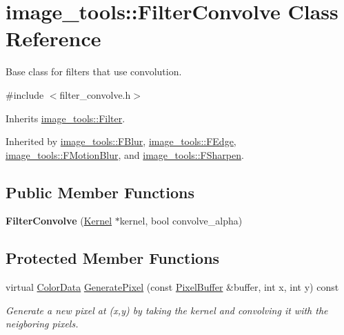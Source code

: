 \hypertarget{classimage__tools_1_1FilterConvolve}{}\section{image\+\_\+tools\+:\+:Filter\+Convolve Class Reference}
\label{classimage__tools_1_1FilterConvolve}


Base class for filters that use convolution.  




{\ttfamily \#include $<$filter\+\_\+convolve.\+h$>$}



Inherits \hyperlink{classimage__tools_1_1Filter}{image\+\_\+tools\+::\+Filter}.



Inherited by \hyperlink{classimage__tools_1_1FBlur}{image\+\_\+tools\+::\+F\+Blur}, \hyperlink{classimage__tools_1_1FEdge}{image\+\_\+tools\+::\+F\+Edge}, \hyperlink{classimage__tools_1_1FMotionBlur}{image\+\_\+tools\+::\+F\+Motion\+Blur}, and \hyperlink{classimage__tools_1_1FSharpen}{image\+\_\+tools\+::\+F\+Sharpen}.

\subsection*{Public Member Functions}
\begin{DoxyCompactItemize}
\item 
{\bfseries Filter\+Convolve} (\hyperlink{classimage__tools_1_1Kernel}{Kernel} $\ast$kernel, bool convolve\+\_\+alpha)\hypertarget{classimage__tools_1_1FilterConvolve_ae5671442eee4070c4aa9d38390653e73}{}\label{classimage__tools_1_1FilterConvolve_ae5671442eee4070c4aa9d38390653e73}

\end{DoxyCompactItemize}
\subsection*{Protected Member Functions}
\begin{DoxyCompactItemize}
\item 
virtual \hyperlink{classimage__tools_1_1ColorData}{Color\+Data} \hyperlink{classimage__tools_1_1FilterConvolve_ad318986a25e6cd6685e61dff5f99adb5}{Generate\+Pixel} (const \hyperlink{classimage__tools_1_1PixelBuffer}{Pixel\+Buffer} \&buffer, int x, int y) const 
\begin{DoxyCompactList}\small\item\em Generate a new pixel at (x,y) by taking the kernel and convolving it with the neigboring pixels. \end{DoxyCompactList}\end{DoxyCompactItemize}
